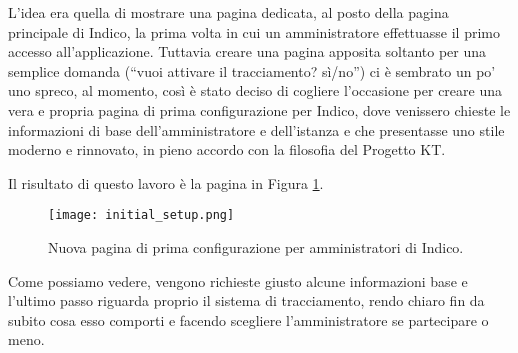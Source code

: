             L'idea era quella di mostrare una pagina dedicata, al posto della pagina principale di Indico, la prima volta in cui un amministratore effettuasse il primo accesso all'applicazione. Tuttavia creare una pagina apposita soltanto per una semplice domanda (``vuoi attivare il tracciamento? sì/no'') ci è sembrato un po' uno spreco, al momento, così è stato deciso di cogliere l'occasione per creare una vera e propria pagina di prima configurazione per Indico, dove venissero chieste le informazioni di base dell'amministratore e dell'istanza e che presentasse uno stile moderno e rinnovato, in pieno accordo con la filosofia del Progetto KT.
            
            Il risultato di questo lavoro è la pagina in Figura \ref{fig:initial_setup}.
            
        	\begin{figure}[h!]
        		\begin{center}
        			\texttt{[image: initial\_setup.png]}
        		\end{center}
        		\caption[Prima configurazione di Indico]{Nuova pagina di prima configurazione per amministratori di Indico.}
        		\label{fig:initial_setup}
        	\end{figure}
        	
        	Come possiamo vedere, vengono richieste giusto alcune informazioni base e l'ultimo passo riguarda proprio il sistema di tracciamento, rendo chiaro fin da subito cosa esso comporti e facendo scegliere l'amministratore se partecipare o meno.
    